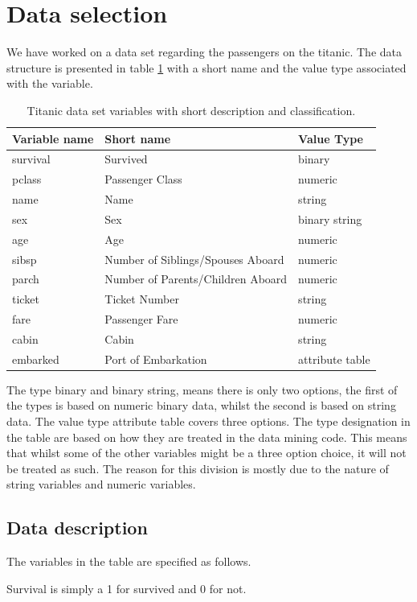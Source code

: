 \documentclass[a4paper,11pt]{article}
\begin{document}
\section{Data selection}
We have worked on a data set regarding the passengers on the titanic. The data structure is presented in table \ref{titanData} with a short name and the value type associated with the variable.
\begin{table}[h]
\begin{tabular}{|l|l|l|}
\hline
Variable name & Short name & Value Type\\
\hline
survival & Survived & binary\\
pclass & Passenger Class & numeric\\
name & Name & string\\
sex & Sex & binary string\\
age & Age & numeric\\
sibsp & Number of Siblings/Spouses Aboard & numeric\\
parch & Number of Parents/Children Aboard & numeric\\
ticket & Ticket Number & string\\
fare & Passenger Fare & numeric\\
cabin & Cabin & string\\
embarked & Port of Embarkation & attribute table\\
\hline
\end{tabular}
\caption{Titanic data set variables with short description and classification.}
\label{titanData}
\end{table}

The type binary and binary string, means there is only two options, the first of the types is based on numeric binary data, whilst the second is based on string data. The value type attribute table covers three options. The type designation in the table are based on how they are treated in the data mining code. This means that whilst some of the other variables might be a three option choice, it will not be treated as such. The reason for this division is mostly due to the nature of string variables and numeric variables.

\subsection{Data description}
The variables in the table are specified as follows. 

Survival is simply a 1 for survived and 0 for not. 
\end{document}
